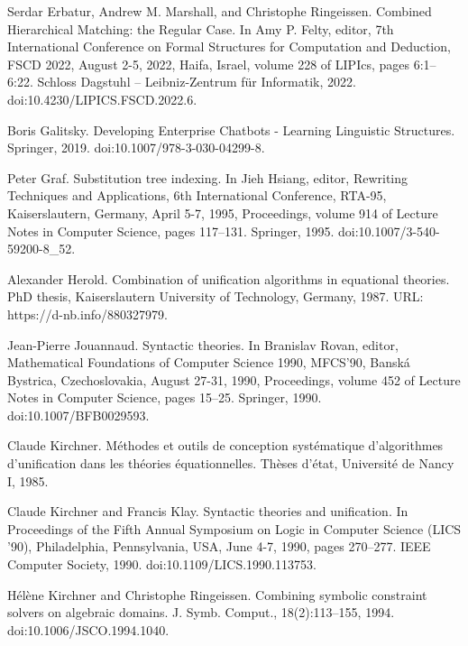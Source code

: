 \par\noindent  [23]  Serdar Erbatur, Andrew M. Marshall, and Christophe Ringeissen.  Combined Hierarchical Matching: the Regular Case.  In Amy P. Felty, editor, 7th International Conference on Formal Structures for Computation and Deduction, FSCD 2022, August 2-5, 2022, Haifa, Israel, volume 228 of LIPIcs, pages 6:1–6:22. Schloss Dagstuhl – Leibniz-Zentrum für Informatik, 2022.  doi:10.4230/LIPICS.FSCD.2022.6.  
 
\par\noindent  [24]  Boris Galitsky.  Developing Enterprise Chatbots - Learning Linguistic Structures.  Springer, 2019.  doi:10.1007/978-3-030-04299-8.  
 
\par\noindent  [25]  Peter Graf.  Substitution tree indexing.  In Jieh Hsiang, editor, Rewriting Techniques and Applications, 6th International Conference, RTA-95, Kaiserslautern, Germany, April 5-7, 1995, Proceedings, volume 914 of Lecture Notes in Computer Science, pages 117–131. Springer, 1995.  doi:10.1007/3-540-59200-8\_52.  
 
\par\noindent  [26]  Alexander Herold.  Combination of unification algorithms in equational theories.  PhD thesis, Kaiserslautern University of Technology, Germany, 1987.  URL: https://d-nb.info/880327979.  
 
\par\noindent  [27]  Jean-Pierre Jouannaud.  Syntactic theories.  In Branislav Rovan, editor, Mathematical Foundations of Computer Science 1990, MFCS’90, Banská Bystrica, Czechoslovakia, August 27-31, 1990, Proceedings, volume 452 of Lecture Notes in Computer Science, pages 15–25. Springer, 1990.  doi:10.1007/BFB0029593.  
 
\par\noindent  [28]  Claude Kirchner.  Méthodes et outils de conception systématique d’algorithmes d’unification dans les théories équationnelles.  Thèses d’état, Université de Nancy I, 1985.  
 
\par\noindent  [29]  Claude Kirchner and Francis Klay.  Syntactic theories and unification.  In Proceedings of the Fifth Annual Symposium on Logic in Computer Science (LICS ’90), Philadelphia, Pennsylvania, USA, June 4-7, 1990, pages 270–277. IEEE Computer Society, 1990.  doi:10.1109/LICS.1990.113753.  
 
\par\noindent  [30]  Hélène Kirchner and Christophe Ringeissen.  Combining symbolic constraint solvers on algebraic domains.  J. Symb. Comput., 18(2):113–155, 1994.  doi:10.1006/JSCO.1994.1040.  
 
